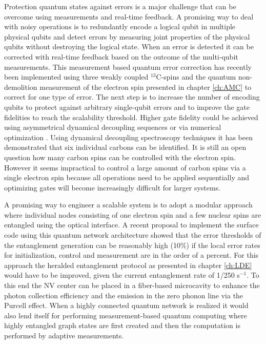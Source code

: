 Protection quantum states against errors is a major challenge that can be overcome using measurements and real-time feedback. A promising way to deal with noisy operations is to redundantly encode a logical qubit in multiple physical qubits and detect errors by measuring joint properties of the physical qubits without destroying the logical state. When an error is detected it can be corrected with real-time feedback based on the outcome of the multi-qubit measurements. This measurement based quantum error correction has recently been implemented using three weakly coupled $^{13}$C-spins and the quantum non-demolition measurement of the electron spin presented in chapter \ref{ch:AMC} to correct for one type of error\cite{Cramer_arXiv_2015}. The next step is to increase the number of encoding qubits to protect against arbitrary single-qubit errors and to improve the gate fidelities to reach the scalability threshold. Higher gate fidelity could be achieved using asymmetrical dynamical decoupling sequences\cite{Casanova_arXiv_2015} or via numerical optimization \cite{Liu_NatCommun_2013,Dolde_NatCommun_2014}. Using dynamical decoupling spectroscopy techniques it has been demonstrated that six individual carbons can be identified\cite{Taminiau_Phys.Rev.Lett._2012}. It is still an open question how many carbon spins can be controlled with the electron spin. However it seems impractical to control a large amount of carbon spins via a single electron spin because all operations need to be applied sequentially and optimizing gates will become increasingly difficult for larger systems.

A promising way to engineer a scalable system is to adopt a modular approach where individual nodes consisting of one electron spin and a few nuclear spins are entangled using the optical interface. A recent proposal to implement the surface code using this quantum network architecture showed that the error thresholds of the entanglement generation can be reasonably high (10\%) if the local error rates for initialization, control and measurement are in the order of a percent\cite{Nickerson_NatCommun_2013}. For this approach the heralded entanglement protocol as presented in chapter \ref{ch:LDE} would have to be improved, given the current entanglement rate of 1/250 s$^{-1}$. To this end the NV center can be placed in a fiber-based microcavity to enhance the photon collection efficiency and the emission in the zero phonon line via the Purcell effect\cite{Kaupp_Phys.Rev.A_2013,Albrecht_Phys.Rev.Lett._2013,Janitz_arXiv_2015}. When a highly connected quantum network is realized it would also lend itself for performing measurement-based quantum computing\cite{Raussendorf_Phys.Rev.Lett._2001,Benjamin_Laser&Photon.Rev._2009} where highly entangled graph states are first created and then the computation is performed by adaptive measurements.

